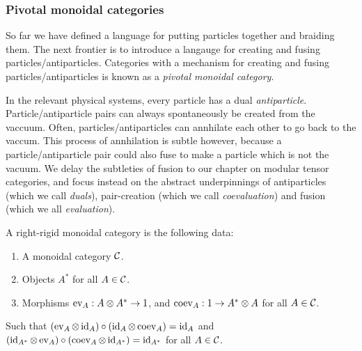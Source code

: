 \subsubsection{Pivotal monoidal categories}

So far we have defined a language for putting particles together and braiding them. The next frontier is to introduce a langauge for creating and fusing particles/antiparticles. Categories with a mechanism for creating and fusing particles/antiparticles is known as a {\em pivotal monoidal category}.

\begin{rem}
In the relevant physical systems, every particle has a dual {\em antiparticle}. Particle/antiparticle pairs can always spontaneously be created from the vaccuum. Often, particles/antiparticles can annhilate each other to go back to the vaccum. This process of annhilation is subtle however, because a particle/antiparticle pair could also fuse to make a particle which is not the vacuum. We delay the subtleties of fusion to our chapter on modular tensor categories, and focus instead on the abstract underpinnings of antiparticles (which we call {\em duals}), pair-creation (which we call {\em coevaluation}) and fusion (which we all {\em evaluation}).
\end{rem}

\begin{ex}\label{pivotal-category-examples}
\end{ex}

\begin{defn} A right-rigid monoidal category is the following data:

\begin{enumerate}
\item A monoidal category ${\mathcal C}$.
\item Objects $A^*$ for all $A\in {\mathcal C}$.
\item Morphisms $\operatorname{ev}_{A}: A\otimes A^*\to 1$, and $\operatorname{coev}_{A}: 1\to A^*\otimes A$ for all $A\in {\mathcal C}$.
\end{enumerate}

Such that $(\operatorname{ev}_A \otimes \operatorname{id}_A)\circ (\operatorname{id}_A\otimes \operatorname{coev}_A)=\operatorname{id}_A$ and $(\operatorname{id}_{A^*}\otimes \operatorname{ev}_A)\circ (\operatorname{coev}_{A}\otimes \operatorname{id}_{A^*})=\operatorname{id}_{A^*}$ for all $A\in {\mathcal C}$. 


\end{defn}

